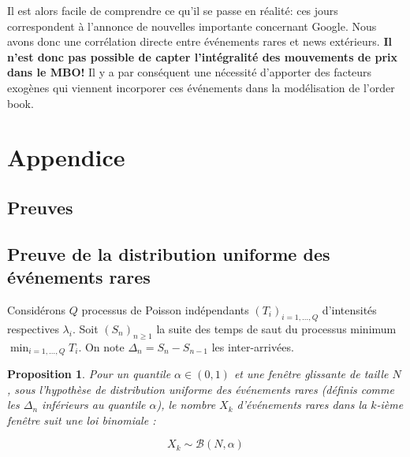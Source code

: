\documentclass[12pt,a4paper]{article}
\newtheorem{proposition}[theorem]{Proposition}
\theoremstyle{definition}
\theoremstyle{remark}
\begin{document}
Il est alors facile de comprendre ce qu'il se passe en réalité: ces jours correspondent à l'annonce de nouvelles importante concernant Google. Nous avons donc une corrélation directe entre événements rares et news extérieurs. \textbf{Il n'est donc pas possible de capter l'intégralité des mouvements de prix dans le MBO!} Il y a par conséquent une nécessité d'apporter des facteurs exogènes qui viennent incorporer ces événements dans la modélisation de l'order book.

\newpage


    
    
    \newpage
    \section*{Appendice}
    \subsection*{Preuves}
    \subsection*{Preuve de la distribution uniforme des événements rares}

    Considérons $Q$ processus de Poisson indépendants $(T_i)_{i=1,\ldots,Q}$ d'intensités respectives $\lambda_i$. Soit $(S_n)_{n\geq 1}$ la suite des temps de saut du processus minimum $\min_{i=1,\ldots,Q} T_i$. On note $\Delta_n = S_n - S_{n-1}$ les inter-arrivées.

    \begin{proposition}
    Pour un quantile $\alpha \in (0,1)$ et une fenêtre glissante de taille $N$, sous l'hypothèse de distribution uniforme des événements rares (définis comme les $\Delta_n$ inférieurs au quantile $\alpha$), le nombre $X_k$ d'événements rares dans la $k$-ième fenêtre suit une loi binomiale :

    \[
    X_k \sim \mathcal{B}(N, \alpha)
    \]
    \end{proposition}
\end{document}
